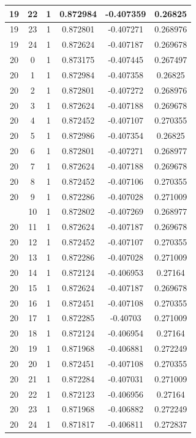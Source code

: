 \documentclass[12pt,a4paper]{article}
\numberwithin{equation}{section}
\numberwithin{figure}{section}
\numberwithin{table}{section}
\begin{document}
\begin{longtable}{|c|c|c|c|c|c|}
19 & 22 & 1 & 0.872984 & -0.407359 & 0.26825 \\ \hline
19 & 23 & 1 & 0.872801 & -0.407271 & 0.268976 \\ \hline
19 & 24 & 1 & 0.872624 & -0.407187 & 0.269678 \\ \hline
20 & 0 & 1 & 0.873175 & -0.407445 & 0.267497 \\ \hline
20 & 1 & 1 & 0.872984 & -0.407358 & 0.26825 \\ \hline
20 & 2 & 1 & 0.872801 & -0.407272 & 0.268976 \\ \hline
20 & 3 & 1 & 0.872624 & -0.407188 & 0.269678 \\ \hline
20 & 4 & 1 & 0.872452 & -0.407107 & 0.270355 \\ \hline
20 & 5 & 1 & 0.872986 & -0.407354 & 0.26825 \\ \hline
20 & 6 & 1 & 0.872801 & -0.407271 & 0.268977 \\ \hline
20 & 7 & 1 & 0.872624 & -0.407188 & 0.269678 \\ \hline
20 & 8 & 1 & 0.872452 & -0.407106 & 0.270355 \\ \hline
20 & 9 & 1 & 0.872286 & -0.407028 & 0.271009 \\ \hline
\pagebreak
20 & 10 & 1 & 0.872802 & -0.407269 & 0.268977 \\ \hline
20 & 11 & 1 & 0.872624 & -0.407187 & 0.269678 \\ \hline
20 & 12 & 1 & 0.872452 & -0.407107 & 0.270355 \\ \hline
20 & 13 & 1 & 0.872286 & -0.407028 & 0.271009 \\ \hline
20 & 14 & 1 & 0.872124 & -0.406953 & 0.27164 \\ \hline
20 & 15 & 1 & 0.872624 & -0.407187 & 0.269678 \\ \hline
20 & 16 & 1 & 0.872451 & -0.407108 & 0.270355 \\ \hline
20 & 17 & 1 & 0.872285 & -0.40703 & 0.271009 \\ \hline
20 & 18 & 1 & 0.872124 & -0.406954 & 0.27164 \\ \hline
20 & 19 & 1 & 0.871968 & -0.406881 & 0.272249 \\ \hline
20 & 20 & 1 & 0.872451 & -0.407108 & 0.270355 \\ \hline
20 & 21 & 1 & 0.872284 & -0.407031 & 0.271009 \\ \hline
20 & 22 & 1 & 0.872123 & -0.406956 & 0.27164 \\ \hline
20 & 23 & 1 & 0.871968 & -0.406882 & 0.272249 \\ \hline
20 & 24 & 1 & 0.871817 & -0.406811 & 0.272837 \\ \hline

\end{longtable}
\end{document}

